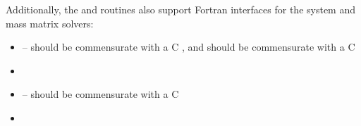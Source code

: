 Additionally, the  and 
routines also support Fortran interfaces for the system and mass
matrix solvers:
\begin{itemize}
\item {} -- 
  should be commensurate with a C , and 
  should be commensurate with a C 
\item {}
\item {} -- 
  should be commensurate with a C 
\item {}
\end{itemize}
